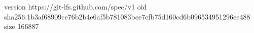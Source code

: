 version https://git-lfs.github.com/spec/v1
oid sha256:1b3af68909ce76b2b4e6af5b781083bce7cfb75d160cd6b096534951296ee488
size 166887
